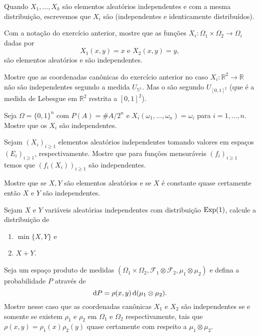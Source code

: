 Quando $X_1, \dots, X_k$ são elementos aleatórios independentes e com a mesma distribuição, escrevemos que $X_i$ são \iid (independentes e identicamente distribuídos).

\begin{exercise}
  Com a notação do exercício anterior, mostre que as funções $X_i:\Omega_1 \times \Omega_2 \to \Omega_i$ dadas por
  \begin{equation}
    X_1(x,y) = x \text{ e } X_2 (x,y) = y,
  \end{equation}
  são elementos aleatórios e são independentes.
\end{exercise}

\begin{exercise}
  Mostre que as coordenadas canônicas do exercício anterior no caso $X_i: \mathbb{R}^2 \to \mathbb{R}$ não são independentes segundo a medida $U_{\mathbb{S}^1}$.
  Mas o são segundo $U_{[0,1]^2}$ (que é a medida de Lebesgue em $\mathbb{R}^2$ restrita a $[0,1]^2$).
\end{exercise}

\begin{exercise}
  Seja $\Omega = \{0,1\}^n$ com $P(A) = \#A/2^n$ e $X_i(\omega_1, \dots, \omega_n) = \omega_i$ para $i = 1, \dots, n$.
  Mostre que os $X_i$ são independentes.
\end{exercise}

\begin{exercise}
  Sejam $(X_i)_{i \geq 1}$ elementos aleatórios independentes tomando valores em espaços $(E_i)_{i \geq 1}$, respectivamente.
  Mostre que para funções mensuráveis $(f_i)_{i \geq 1}$ temos que $(f_i(X_i))_{i \geq 1}$ são independentes.
\end{exercise}

\begin{exercise}
  Mostre que se $X, Y$ são elementos aleatórios e se $X$ é constante quase certamente então $X$ e $Y$ são independentes.
\end{exercise}

\begin{exercise}
  Sejam $X$ e $Y$ variáveis aleatórias independentes com distribuição $\operatorname{Exp}(1)$, calcule a distribuição de
  \begin{enumerate}[\quad a)]
  \item $\min\{X,Y\}$ e
  \item $X + Y$.
  \end{enumerate}
\end{exercise}

\begin{exercise}
  Seja um espaço produto de medidas $(\Omega_1 \times \Omega_2, \mathcal{F}_1 \otimes \mathcal{F}_2, \mu_1 \otimes \mu_2)$ e defina a probabilidade $P$ através de
  \begin{equation}
    \mathop{}\!\mathrm{d} P = \rho(x,y) \mathop{}\!\mathrm{d} (\mu_1 \otimes \mu_2).
  \end{equation}
  Mostre nesse caso que as coordenadas canônicas $X_1$ e $X_2$ são independentes se e somente se existem $\rho_1$ e $\rho_2$ em $\Omega_1$ e $\Omega_2$ respectivamente, tais que $\rho(x,y) = \rho_1(x) \rho_2(y)$ quase certamente com respeito a $\mu_1 \otimes \mu_2$.
\end{exercise}


